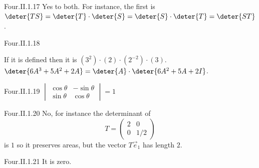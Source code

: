 \begin{ans}{Four.II.1.17}
      Yes to both.
      For instance, the first is \( \deter{TS}=\deter{T}\cdot\deter{S}=
                     \deter{S}\cdot\deter{T}=\deter{ST} \).
    
\end{ans}
\begin{ans}{Four.II.1.18}
      \begin{exparts}
        \partsitem If it is defined then it is
           \( (3^2)\cdot (2)\cdot (2^{-2})\cdot (3) \).
        \partsitem \( \deter{6A^3+5A^2+2A}=\deter{A}\cdot\deter{6A^2+5A+2I} \).
      \end{exparts}
    
\end{ans}
\begin{ans}{Four.II.1.19}
       \(\begin{vmatrix}
                \cos\theta  &-\sin\theta  \\
                \sin\theta  &\cos\theta
              \end{vmatrix}=1 \)
    
\end{ans}
\begin{ans}{Four.II.1.20}
      No, for instance the determinant of
      \begin{equation*}
        T=\begin{pmatrix}
          2  &0  \\
          0  &1/2
        \end{pmatrix}
      \end{equation*}
      is \( 1 \) so it preserves areas, but the vector \( T\vec{e}_1 \)
      has length \( 2 \).
    
\end{ans}
\begin{ans}{Four.II.1.21}
       It is zero.
    
\end{ans}
